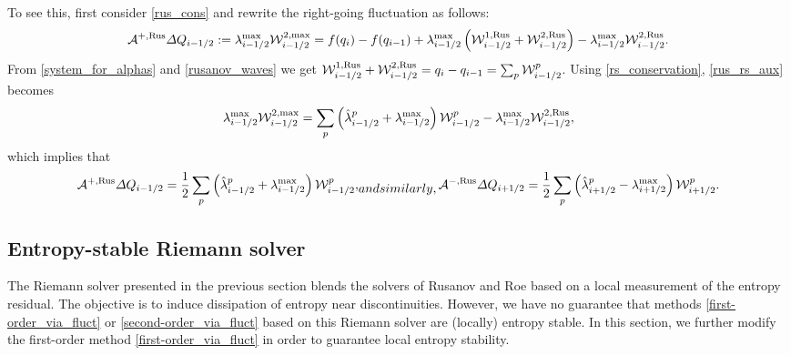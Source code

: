 \documentclass[preprint, 11pt]{article}
\newcommand{\W}{{\mathcal W}}
\newcommand{\A}{{\mathcal A}}
\newcommand{\bff}{{f}}
\newcommand{\bfq}{{q}}
\newcommand{\Rus}{{\rm Rus}}
\begin{document}
To see this, first consider \eqref{rus_cons} and rewrite the right-going fluctuation as follows:
\begin{align}\label{rus_rs_aux}
  \A^{+,\Rus}\Delta Q_{i-1/2}:=\lambda_{i-1/2}^{\max}\W_{i-1/2}^{2,\max}
  = \bff(\bfq_{i})-\bff(\bfq_{i-1}) + \lambda_{i-1/2}^{\max}\left(\W_{i-1/2}^{1,\Rus}+\W_{i-1/2}^{2,\Rus}\right)
  -\lambda_{i-1/2}^{\max}\W_{i-1/2}^{2,\Rus}.
\end{align}
From \eqref{system_for_alphas} and \eqref{rusanov_waves} we get
$\W^{1,\Rus}_{i-1/2}+\W^{2,\Rus}_{i-1/2}=\bfq_i-\bfq_{i-1}=\sum_p\W_{i-1/2}^p$.
Using \eqref{rs_conservation}, \eqref{rus_rs_aux} becomes
\begin{align*}
  \lambda_{i-1/2}^{\max}\W_{i-1/2}^{2,\max}
  = \sum_p \left(\hat \lambda_{i-1/2}^p + \lambda_{i-1/2}^{\max}\right)\W_{i-1/2}^p
  -\lambda_{i-1/2}^{\max}\W_{i-1/2}^{2,\Rus},
\end{align*}
which implies that
\begin{subequations}\label{fluct_rus}
\begin{align}
  \A^{+,\Rus}\Delta Q_{i-1/2}=\frac{1}{2}\sum_p\left(\hat \lambda_{i-1/2}^p + \lambda_{i-1/2}^{\max}\right)\W_{i-1/2}^p,
\end{align}
and similarly,
\begin{align}
  \A^{-,\Rus}\Delta Q_{i+1/2}=\frac{1}{2}\sum_p\left(\hat \lambda_{i+1/2}^p - \lambda_{i+1/2}^{\max}\right)\W_{i+1/2}^p.
\end{align}
\end{subequations}


\subsection{Entropy-stable Riemann solver}\label{sec:entropy_stable}
The Riemann solver presented in the previous section blends the solvers of Rusanov and Roe based on a
local measurement of the entropy residual. The objective is to induce dissipation of entropy
near discontinuities. However, we have no guarantee that methods \eqref{first-order_via_fluct}
or \eqref{second-order_via_fluct} based on this Riemann solver are (locally) entropy stable.
In this section, we further modify the first-order method
\eqref{first-order_via_fluct} in order to guarantee local entropy stability.
\end{document}
